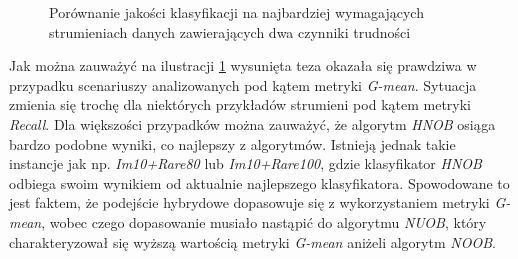 \begin{figure}[h]
    \centering
    \qquad
    \caption{Porównanie jakości klasyfikacji na najbardziej wymagających strumieniach danych zawierających dwa czynniki trudności}\label{Figure:PairsComparisonHNOB}
\end{figure}

\noindent Jak można zauważyć na ilustracji \ref{Figure:PairsComparisonHNOB} wysunięta teza okazała się prawdziwa w przypadku scenariuszy analizowanych pod kątem metryki \textit{G-mean}. Sytuacja zmienia się trochę dla niektórych przykładów strumieni pod kątem metryki \textit{Recall}. Dla większości przypadków można zauważyć, że algorytm \textit{HNOB} osiąga bardzo podobne wyniki, co najlepszy z algorytmów. Istnieją jednak takie instancje jak np. \textit{Im10+Rare80} lub \textit{Im10+Rare100}, gdzie klasyfikator \textit{HNOB} odbiega swoim wynikiem od aktualnie najlepszego klasyfikatora. Spowodowane to jest faktem, że podejście hybrydowe dopasowuje się z wykorzystaniem metryki \textit{G-mean}, wobec czego dopasowanie musiało nastąpić do algorytmu \textit{NUOB}, który charakteryzował się wyższą wartością metryki \textit{G-mean} aniżeli algorytm \textit{NOOB}.

